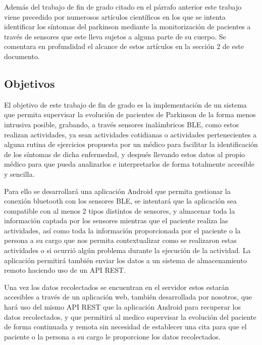 \documentclass[11pt,spanish]{article}
\begin{document}
Además del trabajo de fin de grado citado en el párrafo anterior este trabajo viene precedido por numerosos artículos científicos en los que se intenta identificar los síntomas del parkinson mediante la monitorización de pacientes a través de sensores que este lleva sujetos a alguna parte de su cuerpo. Se comentara en profundidad el alcance de estos artículos en la sección 2 de este documento.

\subsection{Objetivos}

El objetivo de este trabajo de fin de grado es la implementación de un sistema que permita supervisar la evolución de pacientes de Parkinson de la forma menos intrusiva posible, grabando, a través sensores inalámbricos BLE, como estos realizan actividades, ya sean actividades cotidianas o actividades pertenecientes a alguna rutina de ejercicios propuesta por un médico para facilitar la identificación de los síntomas de dicha enfermedad, y después llevando estos datos al propio médico para que pueda analizarlos e interpretarlos de forma totalmente accesible y sencilla. 
\newline

Para ello se desarrollará una aplicación Android que permita gestionar la conexión bluetooth con los sensores BLE, se intentará que la aplicación sea compatible con al menos 2 tipos distintos de sensores, y almacenar toda la información captada por los sensores mientras que el paciente realiza las actividades, así como toda la información proporcionada por el paciente o la persona a su cargo que nos permita contextualizar como se realizaron estas actividades o si ocurrió algún problema durante la ejecución de la actividad. La aplicación permitirá también enviar los datos a un sistema de almacenamiento remoto haciendo uso de un API REST. 
\newline

Una vez los datos recolectados se encuentran en el servidor estos estarán accesibles a través de un aplicación web, también desarrollada por nosotros, que hará uso del mismo API REST que la aplicación Android para recuperar los datos recolectados, y que permitirá al medico supervisar la evolución del paciente de forma continuada y remota sin necesidad de establecer una cita para que el paciente o la persona a su cargo le proporcione los datos recolectados. 
\newline
\end{document}
